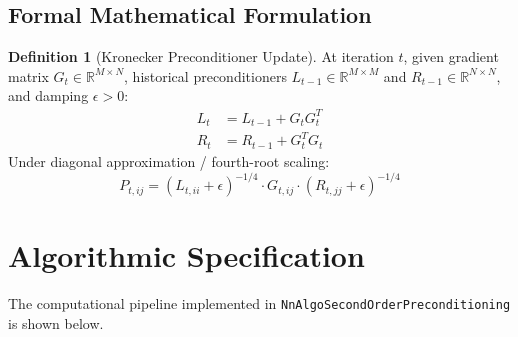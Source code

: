 \documentclass[11pt,a4paper]{article}
\theoremstyle{definition}
\newtheorem{definition}{Definition}[section]
\begin{document}
\subsection{Formal Mathematical Formulation}
\begin{definition}[Kronecker Preconditioner Update]
At iteration $t$, given gradient matrix $G_t \in \mathbb{R}^{M \times N}$, historical preconditioners $L_{t-1} \in \mathbb{R}^{M \times M}$ and $R_{t-1} \in \mathbb{R}^{N \times N}$, and damping $\epsilon > 0$:
\begin{align}
L_t &= L_{t-1} + G_t G_t^T \label{eq:shampoo_l} \\
R_t &= R_{t-1} + G_t^T G_t \label{eq:shampoo_r}
\end{align}
Under diagonal approximation / fourth-root scaling:
\begin{equation}
P_{t, ij} = (L_{t, ii} + \epsilon)^{-1/4} \cdot G_{t, ij} \cdot (R_{t, jj} + \epsilon)^{-1/4} \label{eq:shampoo_p}
\end{equation}
\end{definition}

\section{Algorithmic Specification}

The computational pipeline implemented in \texttt{NnAlgoSecondOrderPreconditioning} is shown below.
\end{document}
